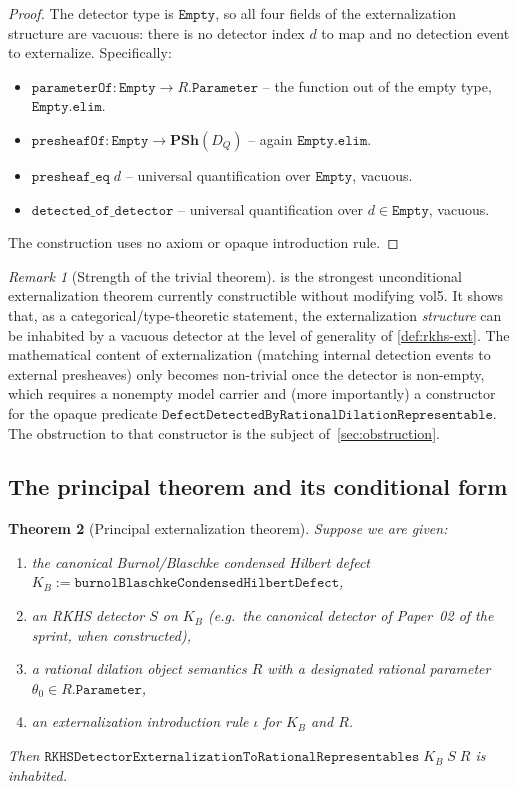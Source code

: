 \documentclass[12pt]{article}
\theoremstyle{plain}
\newtheorem{theorem}{Theorem}[section]
\theoremstyle{definition}
\theoremstyle{remark}
\newtheorem{remark}[theorem]{Remark}
\newcommand{\KB}{K_{B}}
\newcommand{\PSh}{\mathbf{PSh}}
\newcommand{\DQ}{D_{Q}}
\begin{document}
\begin{proof}
The detector type is $\texttt{Empty}$, so all four fields of the
externalization structure are vacuous: there is no detector index $d$
to map and no detection event to externalize.  Specifically:
\begin{itemize}
  \item $\texttt{parameterOf}\colon \texttt{Empty}\to R.\texttt{Parameter}$
    -- the function out of the empty type, $\texttt{Empty.elim}$.
  \item $\texttt{presheafOf}\colon \texttt{Empty}\to\PSh(\DQ)$ --
    again $\texttt{Empty.elim}$.
  \item $\texttt{presheaf\_eq}\;d$ -- universal quantification over
    $\texttt{Empty}$, vacuous.
  \item $\texttt{detected\_of\_detector}$ -- universal quantification
    over $d\in\texttt{Empty}$, vacuous.
\end{itemize}
The construction uses no axiom or opaque introduction rule.
\end{proof}

\begin{remark}[Strength of the trivial theorem]
\label{rem:strength}
 is the strongest unconditional externalization
theorem currently constructible without modifying vol5.  It shows
that, as a categorical/type-theoretic statement, the externalization
\emph{structure} can be inhabited by a vacuous detector at the level
of generality of \cref{def:rkhs-ext}.  The mathematical content of
externalization (matching internal detection events to external
presheaves) only becomes non-trivial once the detector is non-empty,
which requires a nonempty model carrier and (more importantly) a
constructor for the opaque predicate
$\texttt{DefectDetectedByRationalDilationRepresentable}$.  The
obstruction to that constructor is the subject
of~\cref{sec:obstruction}.
\end{remark}

\subsection{The principal theorem and its conditional form}

\begin{theorem}[Principal externalization theorem]
\label{thm:principal}
Suppose we are given:
\begin{enumerate}[label=(\arabic*)]
  \item the canonical Burnol/Blaschke condensed Hilbert defect
    $\KB := \texttt{burnolBlaschkeCondensedHilbertDefect}$,
  \item an RKHS detector $S$ on $\KB$ (e.g.\ the canonical detector
    of Paper~02 of the sprint, when constructed),
  \item a rational dilation object semantics $R$ with a designated
    rational parameter $\theta_0\in R.\texttt{Parameter}$,
  \item an externalization introduction rule
    $\iota$ for $\KB$ and $R$.
\end{enumerate}
Then $\texttt{RKHSDetectorExternalizationToRationalRepresentables}\;
\KB\;S\;R$ is inhabited.
\end{theorem}
\end{document}
